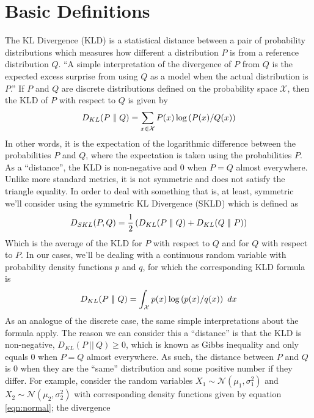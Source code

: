 \section{Basic Definitions}
The KL Divergence (KLD) is a statistical distance between a 
pair of probability distributions which measures how different a distribution $P$ is 
from a reference distribution $Q$. ``A simple interpretation of the 
divergence of $P$ from $Q$ is the expected excess surprise from using $Q$ as a model 
when the actual distribution is $P$.'' If $P$ and $Q$ are discrete distributions 
defined on the probability space $\mathcal{X}$, then the KLD of $P$ with 
respect to $Q$ is given by
\begin{equation}
    D_{KL}(P\ |\!|\ Q) = \sum_{x \in \mathcal{X}}P(x)\log\left(P(x)/Q(x)\right) \label{eqn:discrete KLD}
\end{equation}
In other words, it is the expectation of the logarithmic difference between the 
probabilities $P$ and $Q$, where the expectation is taken using the probabilities 
$P$. As a ``distance'', the KLD is non-negative and 0 when $P = Q$ almost
everywhere. Unlike more standard metrics, it is not symmetric and does not satisfy 
the triangle equality. In order to deal with something that is, at least, symmetric 
we'll consider using the symmetric KL Divergence (SKLD) which is defined as 
\begin{equation}
    D_{SKL}(P, Q) = \frac{1}{2}\parens{D_{KL}(P\ |\!|\ Q) + D_{KL}(Q\ |\!|\ P)}
\end{equation}
Which is the average of the KLD for $P$ with respect to $Q$ and for $Q$
with respect to $P$. In our cases, we'll be dealing with a continuous random variable
with probability density functions $p$ and $q$, for which the corresponding KLD formula 
is
\begin{equation}
    D_{KL}(P\ |\!|\ Q) = \int_\mathcal{X} p(x)\log\left(p(x)/q(x)\right)\ dx \label{eqn:continuous KLD}
\end{equation}
As an analogue of the discrete case, the same simple interpretations about
the formula apply. The reason we can consider this a ``distance'' is that the KLD 
is non-negative, $D_{KL}(P\ |\!|\ Q) \geq 0$, which is known as Gibbs 
inequality and only equals 0 when $P = Q$ almost everywhere. As such, the distance
between $P$ and $Q$ is 0 when they are the ``same'' distribution and some positive 
number if they differ. For example, consider the random variables $X_1 \sim 
\mathcal{N}(\mu_1, \sigma_1^2)$ and $X_2 \sim \mathcal{N}(\mu_2, \sigma_2^2)$ 
with corresponding density functions given by equation \ref{eqn:normal}; the divergence 
